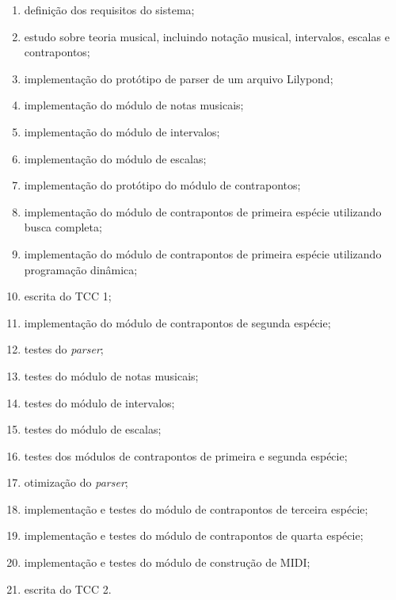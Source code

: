   \begin{enumerate}
    \item \label{t1} definição dos requisitos do sistema;
    \item \label{t2} estudo sobre teoria musical, incluindo notação musical, intervalos, escalas e contrapontos;
    \item \label{t3} implementação do protótipo de parser de um arquivo Lilypond;
    \item \label{t4} implementação do módulo de notas musicais;
    \item \label{t5} implementação do módulo de intervalos;
    \item \label{t6} implementação do módulo de escalas;
    \item \label{t7} implementação do protótipo do módulo de contrapontos;
    \item \label{t8} implementação do módulo de contrapontos de primeira espécie utilizando busca completa;
    \item \label{t9} implementação do módulo de contrapontos de primeira espécie utilizando programação dinâmica;
    \item \label{t10} escrita do TCC 1;
    \item \label{t11} implementação do módulo de contrapontos de segunda espécie;
    \item \label{t12} testes do \textit{parser};
    \item \label{t13} testes do módulo de notas musicais;
    \item \label{t14} testes do módulo de intervalos;
    \item \label{t15} testes do módulo de escalas;
    \item \label{t16} testes dos módulos de contrapontos de primeira e segunda espécie;
    \item \label{t17} otimização do \textit{parser};
    \item \label{t18} implementação e testes do módulo de contrapontos de terceira espécie;
    \item \label{t19} implementação e testes do módulo de contrapontos de quarta espécie;
    \item \label{t20} implementação e testes do módulo de construção de MIDI;
    \item \label{t21} escrita do TCC 2.
  \end{enumerate}

